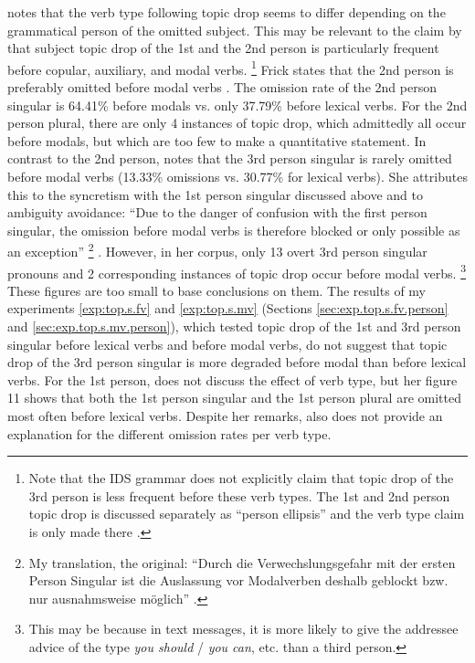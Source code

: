 \citet[96]{frick2017} notes that the verb type following topic drop seems to differ depending on the grammatical person of the omitted subject.
This may be relevant to the claim by \citet{zifonun.etal1997} that subject topic drop of the 1st and the 2nd person is particularly frequent before copular, auxiliary, and modal verbs.%
\footnote{Note that the IDS grammar does not explicitly claim that topic drop of the 3rd person is less frequent before these verb types.
The 1st and 2nd person topic drop is discussed separately as ``person ellipsis'' and the verb type claim is only made there \citep[see][414--417]{zifonun.etal1997}.
}
%
Frick states that the 2nd person is preferably omitted before modal verbs \citep[96]{frick2017}.
The omission rate of the 2nd person singular is 64.41\% before modals vs. only 37.79\% before lexical verbs.
For the 2nd person plural, there are only 4 instances of topic drop, which admittedly all occur before modals, but which are too few to make a quantitative statement.
In contrast to the 2nd person, \citet[96]{frick2017} notes that the 3rd person singular is rarely omitted before modal verbs (13.33\% omissions vs. 30.77\% for lexical verbs).
She attributes this to the syncretism  with the 1st person singular discussed above and to ambiguity avoidance: 
``Due to the danger of confusion with the first person singular, the omission before modal verbs is therefore blocked or only possible as an exception''%
\footnote{My translation, the original: ``Durch die Verwechslungsgefahr mit der ersten Person Singular ist die Auslassung vor Modalverben deshalb geblockt bzw. nur ausnahmsweise möglich'' \citep[108]{frick2017}.}
%
\citep[108]{frick2017}.
However, in her corpus, only 13 overt 3rd person singular pronouns and 2 corresponding instances of topic drop occur before modal verbs.%
\footnote{This may be because in text messages, it is more likely to give the addressee advice of the type \textit{you should} / \textit{you can}, etc. than a third person.}
%
These figures are too small to base conclusions on them. 
The results of my experiments \ref*{exp:top.s.fv} and \ref*{exp:top.s.mv} (Sections \ref{sec:exp.top.s.fv.person} and \ref{sec:exp.top.s.mv.person}), which tested topic drop of the 1st and 3rd person singular before lexical verbs and before modal verbs, do not suggest that topic drop of the 3rd person singular is more degraded before modal than before lexical verbs.
For the 1st person, \citet{frick2017} does not discuss the effect of verb type, but her figure 11 \citep[96]{frick2017} shows that both the 1st person singular and the 1st person plural are omitted most often before lexical verbs.
Despite her remarks, \citet{frick2017} also does not provide an explanation for the different omission rates per verb type.

